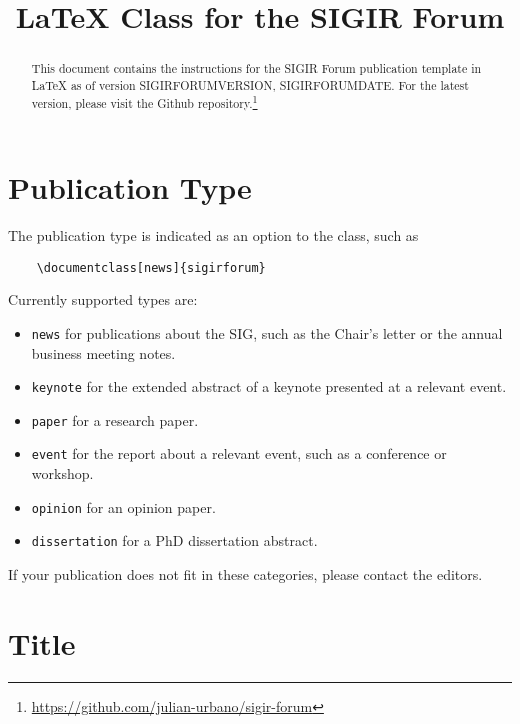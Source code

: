 \documentclass[news]{sigirforum}
\begin{document}
\title{\LaTeX\xspace Class for the SIGIR Forum}


\maketitle 
\begin{abstract}
This document contains the instructions for the SIGIR Forum publication template in \LaTeX\xspace as of version {{SIGIRFORUMVERSION}}, {{SIGIRFORUMDATE}}. For the latest version, please visit the Github repository.\footnote{\url{https://github.com/julian-urbano/sigir-forum}}
\end{abstract}

\section{Publication Type}

The publication type is indicated as an option to the class, such as
\begin{verbatim}
    \documentclass[news]{sigirforum}
\end{verbatim}
Currently supported types are:
\begin{itemize}
	\item \texttt{news} for publications about the SIG, such as the Chair's letter or the annual business meeting notes.
	\item \texttt{keynote} for the extended abstract of a keynote presented at a relevant event.
	\item \texttt{paper} for a research paper.
	\item \texttt{event} for the report about a relevant event, such as a conference or workshop.
	\item \texttt{opinion} for an opinion paper.
	\item \texttt{dissertation} for a PhD dissertation abstract.
\end{itemize}

If your publication does not fit in these categories, please contact the editors.

\section{Title}
\end{document}
